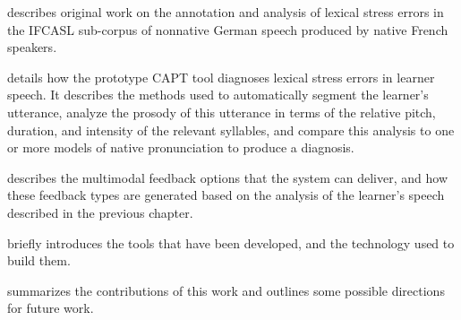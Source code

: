 
describes original work on the annotation and analysis of lexical stress errors in the IFCASL sub-corpus of nonnative German speech produced by native French speakers.

 details how the prototype CAPT tool diagnoses lexical stress errors in learner speech. It describes the methods used to automatically segment the learner's utterance, analyze the prosody of this utterance in terms of the relative pitch, duration, and intensity of the relevant syllables, and compare this analysis to one or more models of native pronunciation to produce a diagnosis.

 describes the multimodal feedback options that the system can deliver, and how these feedback types are generated based on the analysis of the learner's speech described in the previous chapter. 

 briefly introduces the tools that have been developed, and the technology used to build them. 

 summarizes the contributions of this work and outlines some 
possible directions for future work.



%

